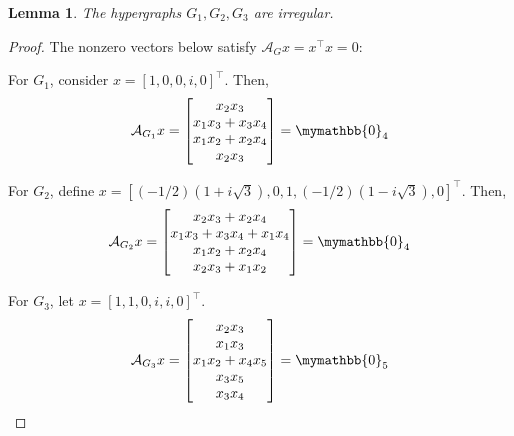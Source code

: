 \documentclass[12pt]{article}
\numberwithin{equation}{section}
\newtheorem{lemma}[theorem]{Lemma}
\theoremstyle{definition}
\begin{document}
\begin{lemma}
\label{lem:special_examples}
The hypergraphs $G_1,G_2,G_3$ are irregular. 
\end{lemma}
\begin{proof}
The nonzero vectors below satisfy $\mathcal{A}_G x = x^\top x = 0$:

For $G_1$, consider $x = [1 , 0 , 0 , i , 0 ]^\top$. Then,
\begin{equation*}
\label{eqn:homogenous_G1}
\mathcal{A}_{G_1} x = \begin{bmatrix}
x_2 x_3  \\
x_1 x_3 + x_3 x_4 \\
x_1 x_2 + x_2 x_4  \\
x_2 x_3 
\end{bmatrix} = \mymathbb{0}_4
\end{equation*}

For $G_2$, define $x = [(-1/2)(1+i\sqrt{3}) , 0 , 1 , (-1/2)(1-i\sqrt{3}) , 0 ]^\top $. Then,
\begin{equation*}
\label{eqn:homogenous_G2}
\mathcal{A}_{G_2} x = \begin{bmatrix}
x_2 x_3 + x_2 x_4  \\
x_1 x_3 + x_3 x_4 + x_1 x_4   \\
x_1 x_2 + x_2 x_4  \\
x_2 x_3 + x_1 x_2  
\end{bmatrix} = \mymathbb{0}_4
\end{equation*}

For $G_3$, let $x = [1 , 1 , 0 , i , i, 0]^\top $.
\begin{equation*}
\label{eqn:homogenous_G3}
\mathcal{A}_{G_3} x = \begin{bmatrix}
x_2 x_3  \\
x_1 x_3  \\
x_1 x_2 + x_4 x_5   \\
x_3 x_5   \\
x_3 x_4  
\end{bmatrix} = \mymathbb{0}_5
\end{equation*} 
\end{proof}
\end{document}
